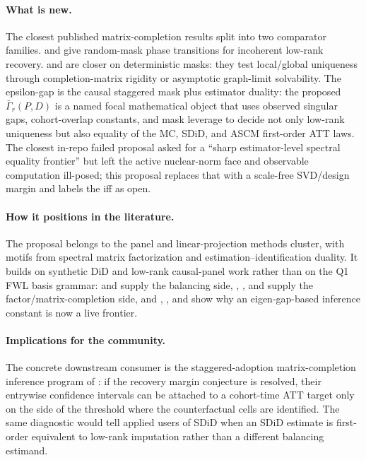 \documentclass[11pt]{article}
\theoremstyle{definition}
\theoremstyle{plain}
\theoremstyle{remark}
\begin{document}
\paragraph{What is new.}
The closest published matrix-completion results split into two comparator
families. \citet[Section~1 and Theorems~1--3]{CandesTao2010} and
\citet[Section~II]{KeshavanMontanariOh2010} give random-mask phase transitions
for incoherent low-rank recovery. \citet[Sections~2--4]{SingerCucuringu2010}
and \citet[Theorem~1.3]{Chatterjee2020} are closer on deterministic masks:
they test local/global uniqueness through completion-matrix rigidity or
asymptotic graph-limit solvability. The epsilon-gap is the causal staggered
mask plus estimator duality: the proposed $\bar\Gamma_r(P,D)$ is a named focal
mathematical object that uses observed singular gaps, cohort-overlap constants,
and mask leverage to decide not only low-rank uniqueness but also equality of
the MC, SDiD, and ASCM first-order ATT laws. The closest in-repo failed
proposal asked for a ``sharp estimator-level spectral equality frontier'' but
left the active nuclear-norm face and observable computation ill-posed; this
proposal replaces that with a scale-free SVD/design margin and labels the iff
as open.

\paragraph{How it positions in the literature.}
The proposal belongs to the panel and linear-projection methods cluster, with
motifs from spectral matrix factorization and estimation--identification
duality. It builds on synthetic DiD and low-rank causal-panel work rather than
on the Q1 FWL basis grammar: \citet{ArkhangelskyAtheyHirshbergImbensWager2021}
and \citet{BenMichaelFellerRothstein2022} supply the balancing side,
\citet{AtheyBayatiDoudchenkoImbensKhosravi2021}, \citet{BaiNg2021}, and
\citet{MoonWeidner2015} supply the factor/matrix-completion side, and
\citet{ChoiYuan2024}, \citet{YanWainwright2024}, and
\citet{ChoiKwonLiao2024} show why an eigen-gap-based inference constant is
now a live frontier.

\paragraph{Implications for the community.}
The concrete downstream consumer is the staggered-adoption matrix-completion
inference program of \citet{YanWainwright2024}: if the recovery margin
conjecture is resolved, their entrywise confidence intervals can be attached
to a cohort-time ATT target only on the side of the threshold where the
counterfactual cells are identified. The same diagnostic would tell applied
users of \citet{ArkhangelskyAtheyHirshbergImbensWager2021} SDiD when an SDiD
estimate is first-order equivalent to low-rank imputation rather than a
different balancing estimand.
\end{document}
